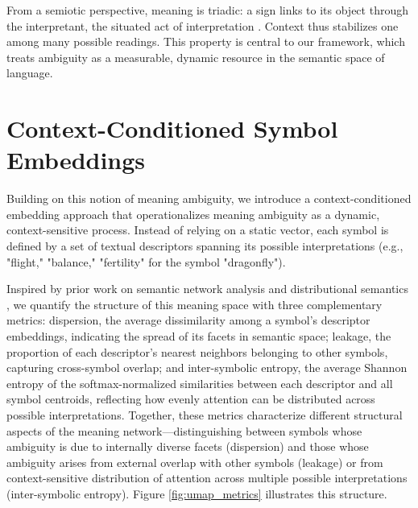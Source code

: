 \documentclass[final,creativeai]{article}
\begin{document}
From a semiotic perspective, meaning is triadic: a sign links to its object through the interpretant, the situated act of interpretation \citep{kilstrup_naturalizing_2015, smythe_formal_1998, innis_semiotics_1985}. Context thus stabilizes one among many possible readings. This property is central to our framework, which treats ambiguity as a measurable, dynamic resource in the semantic space of language.

\section{Context-Conditioned Symbol Embeddings}
Building on this notion of meaning ambiguity, we introduce a context-conditioned embedding approach that operationalizes meaning ambiguity as a dynamic, context-sensitive process. Instead of relying on a static vector, each symbol is defined by a set of textual descriptors spanning its possible interpretations (e.g., "flight," "balance," "fertility" for the symbol "dragonfly").


Inspired by prior work on semantic network analysis and distributional semantics \citep{steyvers_large-scale_2005, mikolov_efficient_2013, arora_simple_2017}, we quantify the structure of this meaning space with three complementary metrics: dispersion, the average dissimilarity among a symbol's descriptor embeddings, indicating the spread of its facets in semantic space; leakage, the proportion of each descriptor's nearest neighbors belonging to other symbols, capturing cross-symbol overlap; and inter-symbolic entropy, the average Shannon entropy of the softmax-normalized similarities between each descriptor and all symbol centroids, reflecting how evenly attention can be distributed across possible interpretations. Together, these metrics characterize different structural aspects of the meaning network—distinguishing between symbols whose ambiguity is due to internally diverse facets (dispersion) and those whose ambiguity arises from external overlap with other symbols (leakage) or from context-sensitive distribution of attention across multiple possible interpretations (inter-symbolic entropy). Figure \ref{fig:umap_metrics} illustrates this structure.
\end{document}
